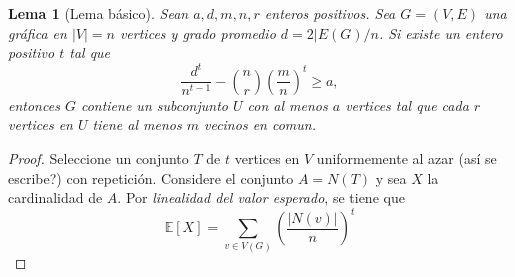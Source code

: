 \documentclass[12pt]{article}
\newcommand{\E}{\mathbb{E}}
\newtheorem{lema}[section]{Lema}
\begin{document}
\begin{lema}[Lema básico]
    Sean $a, d, m, n, r$ enteros positivos. Sea $G = (V, E)$ una gráfica en
    $\vert V \vert = n$ vertices y grado promedio $d = 2 \vert E(G) /n$. Si existe un entero positivo $t$ tal que 
    $$\frac{d^t}{n^{t-1}} - \binom{n}{r} \left(\frac{m}{n}\right)^t \ge a,$$
    entonces $G$ contiene un subconjunto $U$ con al menos $a$ vertices tal que cada $r$ vertices en $U$ tiene al menos $m$ vecinos en comun.
\end{lema}
\begin{proof}
    Seleccione un conjunto $T$ de $t$ vertices en $V$ uniformemente al azar (así se escribe?) con repetición. Considere el conjunto $A = N(T)$ y 
    sea $X$ la cardinalidad de $A$. Por \textit{linealidad del valor esperado}, se tiene que
    $$\E[X] = \sum_{v \in V(G)} \left( \frac{\vert N(v) \vert}{n} \right)^t $$

\end{proof}
\end{document}
